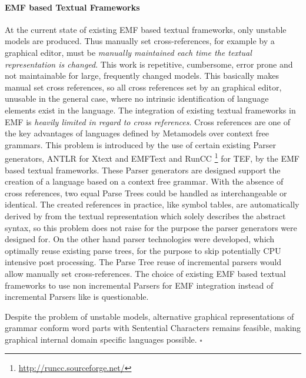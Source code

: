 \paragraph{EMF based Textual Frameworks}
At the current state of existing EMF based textual frameworks, only unstable models are produced. Thus manually set cross-references, for example by a graphical editor, must be \emph{manually maintained each time the textual representation is changed}. This work is repetitive, cumbersome, error prone and not maintainable for large, frequently changed models. This basically makes manual set cross references, so all cross references set by an graphical editor, unusable in the general case, where no intrinsic identification of language elements exist in the language. The integration of existing textual frameworks in EMF is \emph{heavily limited in regard to cross references}. Cross references are one of the key advantages of languages defined by Metamodels over context free grammars. This problem is introduced by the use of certain existing Parser generators, ANTLR for Xtext and EMFText and RunCC \footnote{\raggedright \url{http://runcc.sourceforge.net/}} for TEF, by the EMF based textual frameworks. These Parser generators are designed support the creation of a language based on a context free grammar. With the absence of cross references, two equal Parse Trees could be handled as interchangeable or identical. The created references in practice, like symbol tables, are automatically derived by from the textual representation which solely describes the abstract syntax, so this problem does not raise for the purpose the parser generators were designed for. On the other hand parser technologies were developed, which optimally reuse existing parse trees, for the purpose to skip potentially CPU intensive post processing. The Parse Tree reuse of incremental parsers would allow manually set cross-references. The choice of existing EMF based textual frameworks to use non incremental Parsers for EMF integration instead of incremental Parsers like \cite{xglr} is questionable.


Despite the problem of unstable models, alternative graphical representations of grammar conform word parts with Sentential Characters remains feasible, making graphical internal domain specific languages possible. 
$\square$
